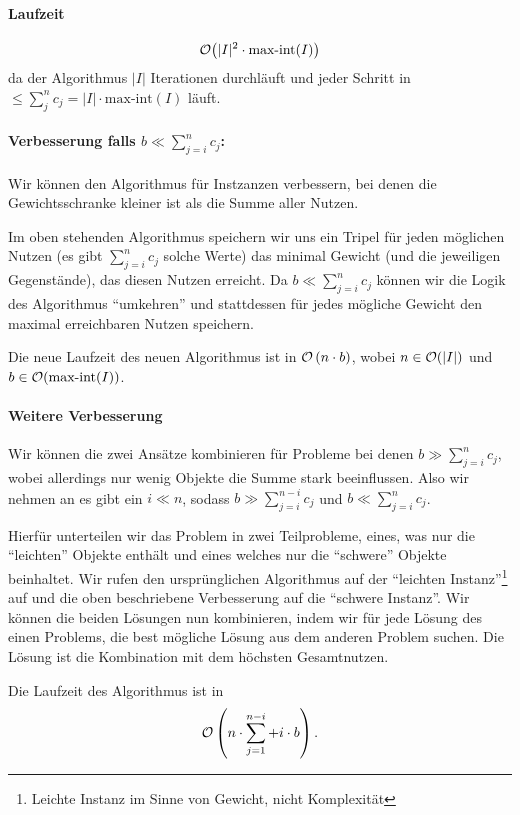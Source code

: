 \paragraph{Laufzeit} \[\mathcal{O} \big( |I|^2 \cdot \text{max-int}(I) \big)\] da der Algorithmus $|I|$ Iterationen durchläuft und
jeder Schritt in $\leq \sum_j^n c_j = |I| \cdot \text{max-int}(I)$ läuft.

\paragraph{Verbesserung falls \(b \ll \sum_{j=i}^{n} c_j\):} Wir können den Algorithmus für Instzanzen verbessern, bei denen die Gewichtsschranke kleiner ist als die Summe aller Nutzen.

Im oben stehenden Algorithmus speichern wir uns ein Tripel für jeden möglichen Nutzen (es gibt \(\sum_{j=i}^{n} c_j\) solche Werte) das minimal Gewicht (und die jeweiligen Gegenstände), das diesen Nutzen erreicht. Da \(b \ll \sum_{j=i}^{n} c_j\) können wir die Logik des Algorithmus ``umkehren'' und stattdessen für jedes mögliche Gewicht den maximal erreichbaren Nutzen speichern. 

Die neue Laufzeit des neuen Algorithmus ist in \(\mathcal{O} \left (n \cdot b\right)\), wobei \(n \in \mathcal{O}(|I|)\) und \(b \in \mathcal{O}(\text{max-int}(I))\).

\paragraph{Weitere Verbesserung} Wir können die zwei Ansätze kombinieren für Probleme bei denen \(b \gg \sum_{j=i}^{n} c_j\), wobei allerdings nur wenig Objekte die Summe stark beeinflussen. Also wir nehmen an es gibt ein \(i \ll n\), sodass \(b \gg \sum_{j=i}^{n - i} c_j\) und \(b \ll \sum_{j=i}^{n} c_j\).

Hierfür unterteilen wir das Problem in zwei Teilprobleme, eines, was nur die ``leichten'' Objekte enthält und eines welches nur die ``schwere'' Objekte beinhaltet. Wir rufen den ursprünglichen Algorithmus auf der ``leichten Instanz''\footnote{Leichte Instanz im Sinne von Gewicht, nicht Komplexität} auf und die oben beschriebene Verbesserung auf die ``schwere Instanz''. Wir können die beiden Lösungen nun kombinieren, indem wir für jede Lösung des einen Problems, die best mögliche Lösung aus dem anderen Problem suchen. Die Lösung ist die Kombination mit dem höchsten Gesamtnutzen.

Die Laufzeit des Algorithmus ist in
\[\mathcal{O}\left(n \cdot \sum_{j = 1}^{n-i} + i \cdot b \right).\]
